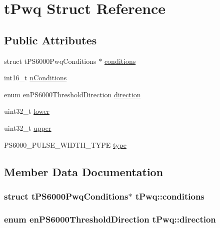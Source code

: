 \hypertarget{structtPwq}{}\section{t\+Pwq Struct Reference}
\label{structtPwq}
\subsection*{Public Attributes}
\begin{DoxyCompactItemize}
\item 
struct t\+P\+S6000\+Pwq\+Conditions $\ast$ \hyperlink{structtPwq_a38517fdb8b8de0dad4958a2b53bed3e7}{conditions}
\item 
int16\+\_\+t \hyperlink{structtPwq_a1504dd915be3fa91682d5f1aaac5cfac}{n\+Conditions}
\item 
enum en\+P\+S6000\+Threshold\+Direction \hyperlink{structtPwq_ab334025f4f09b2c16f8d1570b1f419f2}{direction}
\item 
uint32\+\_\+t \hyperlink{structtPwq_a19cdd72b9c92662990407e63f09d99d0}{lower}
\item 
uint32\+\_\+t \hyperlink{structtPwq_ac488b82554fc26e25125cbcb73046eac}{upper}
\item 
P\+S6000\+\_\+\+P\+U\+L\+S\+E\+\_\+\+W\+I\+D\+T\+H\+\_\+\+T\+Y\+PE \hyperlink{structtPwq_aad2ba1d7b686ae62cae5759c18419762}{type}
\end{DoxyCompactItemize}


\subsection{Member Data Documentation}
\subsubsection[{\texorpdfstring{conditions}{conditions}}]{\setlength{\rightskip}{0pt plus 5cm}struct t\+P\+S6000\+Pwq\+Conditions$\ast$ t\+Pwq\+::conditions}\hypertarget{structtPwq_a38517fdb8b8de0dad4958a2b53bed3e7}{}\label{structtPwq_a38517fdb8b8de0dad4958a2b53bed3e7}
\subsubsection[{\texorpdfstring{direction}{direction}}]{\setlength{\rightskip}{0pt plus 5cm}enum en\+P\+S6000\+Threshold\+Direction t\+Pwq\+::direction}\hypertarget{structtPwq_ab334025f4f09b2c16f8d1570b1f419f2}{}\label{structtPwq_ab334025f4f09b2c16f8d1570b1f419f2}
